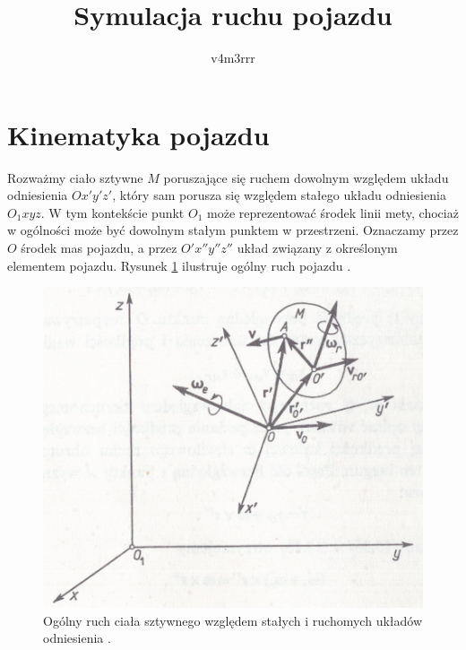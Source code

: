 \documentclass{article}
\title{Symulacja ruchu pojazdu}
\author{v4m3rrr}
\begin{document}
	\maketitle
	\tableofcontents
	\newpage
	
	\section{Kinematyka pojazdu}
	
	Rozważmy ciało sztywne $M$ poruszające się ruchem dowolnym względem układu odniesienia $Ox'y'z'$, który sam porusza się względem stałego układu odniesienia $O_1xyz$. W tym kontekście punkt $O_1$ może reprezentować środek linii mety, chociaż w ogólności może być dowolnym stałym punktem w przestrzeni. Oznaczamy przez $O$ środek mas pojazdu, a przez $O'x''y''z''$ układ związany z określonym elementem pojazdu. Rysunek \ref{fig:rigid_body} ilustruje ogólny ruch pojazdu \cite{Leyko}.
	
	\begin{figure}[h!]
		\centering
		\includegraphics{motion_rigid_body.png}
		\caption{Ogólny ruch ciała sztywnego względem stałych i ruchomych układów odniesienia \cite{Leyko}.}
		\label{fig:rigid_body}
	\end{figure}
	
\end{document}
